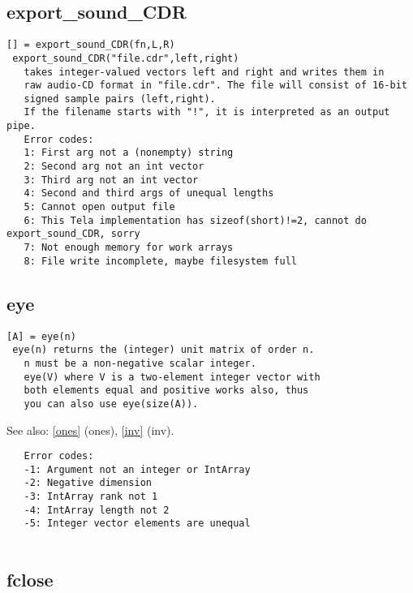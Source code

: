 \documentclass[a4paper]{article}
\begin{document}
\subsection{export\_sound\_CDR\label{export_sound_CDR}}

\begin{tscreen}
\begin{verbatim}
[] = export_sound_CDR(fn,L,R)
 export_sound_CDR("file.cdr",left,right)
   takes integer-valued vectors left and right and writes them in
   raw audio-CD format in "file.cdr". The file will consist of 16-bit
   signed sample pairs (left,right).
   If the filename starts with "!", it is interpreted as an output pipe.
   Error codes:
   1: First arg not a (nonempty) string
   2: Second arg not an int vector
   3: Third arg not an int vector
   4: Second and third args of unequal lengths
   5: Cannot open output file
   6: This Tela implementation has sizeof(short)!=2, cannot do export_sound_CDR, sorry
   7: Not enough memory for work arrays
   8: File write incomplete, maybe filesystem full
\end{verbatim}
\end{tscreen}





\subsection{eye\label{eye}}

\begin{tscreen}
\begin{verbatim}
[A] = eye(n)
 eye(n) returns the (integer) unit matrix of order n.
   n must be a non-negative scalar integer.
   eye(V) where V is a two-element integer vector with
   both elements equal and positive works also, thus
   you can also use eye(size(A)).
\end{verbatim}

See also: \ref{ones} {(ones)}, \ref{inv} {(inv)}.
\begin{verbatim}
   Error codes:
   -1: Argument not an integer or IntArray
   -2: Negative dimension
   -3: IntArray rank not 1
   -4: IntArray length not 2
   -5: Integer vector elements are unequal
   
\end{verbatim}
\end{tscreen}





\subsection{fclose\label{fclose}}
\end{document}
